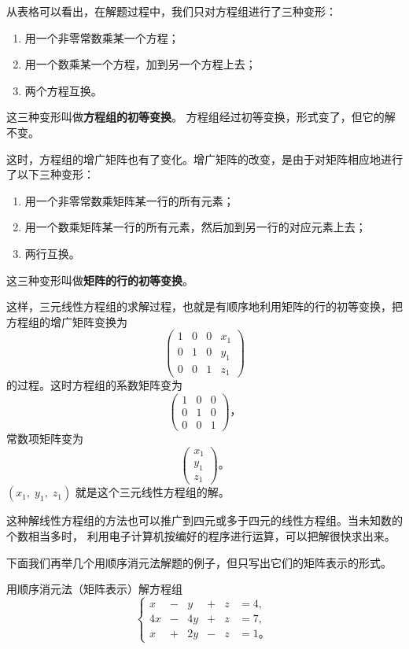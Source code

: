 从表格可以看出，在解题过程中，我们只对方程组进行了三种变形：

\begin{enumerate}[(1), nosep]
    \item 用一个非零常数乘某一个方程；
    \item 用一个数乘某一个方程，加到另一个方程上去；
    \item 两个方程互换。
\end{enumerate}

这三种变形叫做\textbf{方程组的初等变换}。
方程组经过初等变换，形式变了，但它的解不变。

这时，方程组的增广矩阵也有了变化。增广矩阵的改变，是由于对矩阵相应地进行了以下三种变形：

\begin{enumerate}[(1), nosep]
    \item 用一个非零常数乘矩阵某一行的所有元素；
    \item 用一个数乘矩阵某一行的所有元素，然后加到另一行的对应元素上去；
    \item 两行互换。
\end{enumerate}

这三种变形叫做\textbf{矩阵的行的初等变换}。

这样，三元线性方程组的求解过程，也就是有顺序地利用矩阵的行的初等变换，把方程组的增广矩阵变换为
$$\begin{pmatrix*}
    1 & 0 & 0 & x_1 \\
    0 & 1 & 0 & y_1 \\
    0 & 0 & 1 & z_1
\end{pmatrix*}$$
的过程。这时方程组的系数矩阵变为
$$\begin{pmatrix*}
    1 & 0 & 0 \\
    0 & 1 & 0 \\
    0 & 0 & 1
\end{pmatrix*} \text{，}$$
常数项矩阵变为
$$\begin{pmatrix*}
    x_1 \\
    y_1 \\
    z_1
\end{pmatrix*} \text{。}$$
$(x_1,\; y_1,\; z_1)$ 就是这个三元线性方程组的解。

这种解线性方程组的方法也可以推广到四元或多于四元的线性方程组。当未知数的个数相当多时，
利用电子计算机按编好的程序进行运算，可以把解很快求出来。

下面我们再举几个用顺序消元法解题的例子，但只写出它们的矩阵表示的形式。

\setcounter{cntliti}{1}
\liti 用顺序消元法（矩阵表示）解方程组
$$\left\{
    \begin{alignedat}{3}
        x  & -{} &  y & +{} & z & = 4, \\
        4x & -{} & 4y & +{} & z & = 7, \\
        x  & +{} & 2y & -{} & z & = 1 \text{。}
    \end{alignedat}
\right.$$


